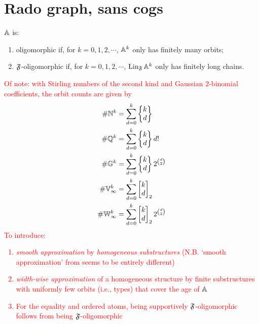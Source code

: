 \section{Rado graph, sans cogs}

$\mathbb{A}$ is: 
\begin{enumerate}
    \item oligomorphic if, for $k = 0, 1, 2, \cdots$, $\mathbb{A}^k$ only has finitely many orbits;
    \item $\mathfrak{F}$-oligomorphic if, for $k = 0, 1, 2, \cdots$, $\operatorname{Lin}_{\mathfrak{F}} \mathbb{A}^k$ only has finitely long chains.
\end{enumerate}
\textcolor{red}{
Of note: with Stirling numbers of the second kind and Gaussian $2$-binomial coefficients,
the orbit counts are given by
\begin{align*}
    \# \mathbb{N}^k &= \sum_{d=0}^k \begin{Bmatrix} k \\ d \end{Bmatrix} \\
    \# \mathbb{Q}^k &= \sum_{d=0}^k \begin{Bmatrix} k \\ d \end{Bmatrix} d! \\
    \# \mathbb{G}^k &= \sum_{d=0}^k \begin{Bmatrix} k \\ d \end{Bmatrix} 2^{\binom{d}{2}} \\
    \# \mathbb{V}_\infty^k &= \sum_{d=0}^k \begin{bmatrix} k \\ d \end{bmatrix}_2 \\
    \# \mathbb{W}_\infty^k &= \sum_{d=0}^k \begin{bmatrix} k \\ d \end{bmatrix}_2 2^{\binom{d}{2}}
\end{align*}
To introduce: 
\begin{enumerate}
    \item 
    \emph{smooth approximation} by \emph{homogeneous substructures} \cite{KLM89} (N.B. `smooth approximation' from \cite[Definition~4]{MP24} seems to be entirely different)
    \item 
    \emph{width-wise approximation} of a homogeneous structure by finite substructures with uniformly few orbits (i.e., types)
    that cover the age of $\mathbb{A}$
    \item 
    For the equality and ordered atoms, being supportively $\mathfrak{F}$-oligomorphic follows from being $\mathfrak{F}$-oligomorphic \cite[Theorem~4.10]{BFKM24}
\end{enumerate}}

